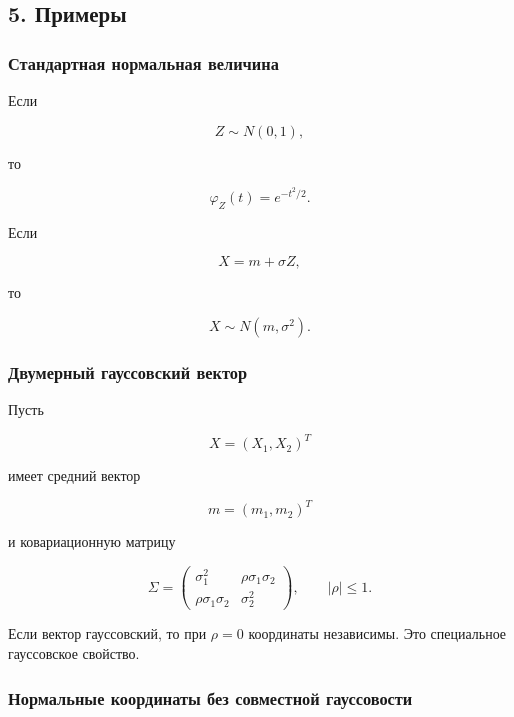 \documentclass[
  11pt,
  a4paper,
]{article}
\begin{document}
\subsection{5. Примеры}\label{ux43fux440ux438ux43cux435ux440ux44b}

\subsubsection{Стандартная нормальная
величина}\label{ux441ux442ux430ux43dux434ux430ux440ux442ux43dux430ux44f-ux43dux43eux440ux43cux430ux43bux44cux43dux430ux44f-ux432ux435ux43bux438ux447ux438ux43dux430}

Если

\[
Z\sim N(0,1),
\]

то

\[
\varphi_Z(t)=e^{-t^2/2}.
\]

Если

\[
X=m+\sigma Z,
\]

то

\[
X\sim N(m,\sigma^2).
\]

\subsubsection{Двумерный гауссовский
вектор}\label{ux434ux432ux443ux43cux435ux440ux43dux44bux439-ux433ux430ux443ux441ux441ux43eux432ux441ux43aux438ux439-ux432ux435ux43aux442ux43eux440}

Пусть

\[
X=(X_1,X_2)^T
\]

имеет средний вектор

\[
m=(m_1,m_2)^T
\]

и ковариационную матрицу

\[
\Sigma=
\begin{pmatrix}
\sigma_1^2 & \rho\sigma_1\sigma_2\\
\rho\sigma_1\sigma_2 & \sigma_2^2
\end{pmatrix},
\qquad
|\rho|\le1.
\]

Если вектор гауссовский, то при \(\rho=0\) координаты независимы. Это
специальное гауссовское свойство.

\subsubsection{Нормальные координаты без совместной
гауссовости}\label{ux43dux43eux440ux43cux430ux43bux44cux43dux44bux435-ux43aux43eux43eux440ux434ux438ux43dux430ux442ux44b-ux431ux435ux437-ux441ux43eux432ux43cux435ux441ux442ux43dux43eux439-ux433ux430ux443ux441ux441ux43eux432ux43eux441ux442ux438}
\end{document}
